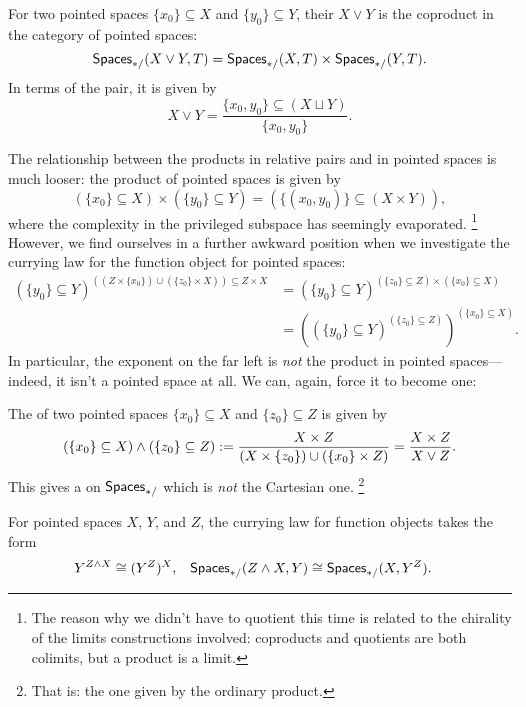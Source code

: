\begin{definition}
For two pointed spaces $\{x_0\} \subseteq X$ and $\{y_0\} \subseteq Y$, their  $X \vee Y$ is the coproduct in the category of pointed spaces: \[\mathsf{Spaces}_{*/}(X \vee Y, T) = \mathsf{Spaces}_{*/}(X, T) \times \mathsf{Spaces}_{*/}(Y, T).\]
In terms of the pair, it is given by \[X \vee Y = \frac{\{x_0, y_0\} \subseteq (X \sqcup Y)}{\{x_0, y_0\}}.\]
\end{definition}

The relationship between the products in relative pairs and in pointed spaces is much looser: the product of pointed spaces is given by \[(\{x_0\} \subseteq X) \times (\{y_0\} \subseteq Y) = (\{(x_0, y_0)\} \subseteq (X \times Y)),\] where the complexity in the privileged subspace has seemingly evaporated.
\footnote{The reason why we didn't have to quotient this time is related to the chirality of the limits constructions involved: coproducts and quotients are both colimits, but a product is a limit.}
However, we find ourselves in a further awkward position when we investigate the currying law for the function object for pointed spaces:
\begin{align*}
(\{y_0\} \subseteq Y)^{((Z \times \{x_0\}) \cup (\{z_0\} \times X)) \subseteq Z \times X} & = (\{y_0\} \subseteq Y)^{(\{z_0\} \subseteq Z) \times (\{x_0\} \subseteq X)} \\
& = \left( (\{y_0\} \subseteq Y)^{(\{z_0\} \subseteq Z)} \right)^{(\{x_0\} \subseteq X)}.
\end{align*}
In particular, the exponent on the far left is \emph{not} the product in pointed spaces---indeed, it isn't a pointed space at all.
We can, again, force it to become one:

\begin{definition}
The  of two pointed spaces $\{x_0\} \subseteq X$ and $\{z_0\} \subseteq Z$ is given by \[(\{x_0\} \subseteq X) \wedge (\{z_0\} \subseteq Z) := \frac{X \times Z}{(X \times \{z_0\}) \cup (\{x_0\} \times Z)} = \frac{X \times Z}{X \vee Z}.\]
This gives a  on $\mathsf{Spaces}_{*/}$ which is \emph{not} the Cartesian one.
\footnote{That is: the one given by the ordinary product.}
\end{definition}

\begin{corollary}
For pointed spaces $X$, $Y$, and $Z$, the currying law for function objects takes the form
\begin{align*}
Y^{Z \wedge X} & \cong (Y^Z)^X, &
\mathsf{Spaces}_{*/}(Z \wedge X, Y) & \cong \mathsf{Spaces}_{*/}(X, Y^Z).
\end{align*}
\end{corollary}

